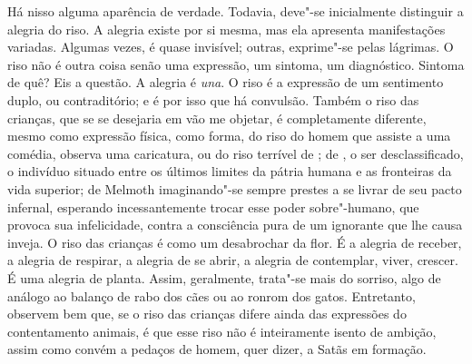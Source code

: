 Há nisso alguma aparência de verdade. Todavia, deve"-se inicialmente
distinguir a alegria do riso. A alegria existe por si mesma, mas ela
apresenta manifestações variadas. Algumas vezes, é quase invisível;
outras, exprime"-se pelas lágrimas. O riso não é outra coisa senão uma
expressão, um sintoma, um diagnóstico. Sintoma de quê? Eis a questão. A
alegria é \textit{una}. O riso é a expressão de um sentimento duplo, ou
contraditório; e é por isso que há convulsão. Também o riso das
crianças, que se se desejaria em vão me objetar, é completamente
diferente, mesmo como expressão física, como forma, do riso do homem
que assiste a uma comédia, observa uma caricatura, ou do riso terrível
de ; de , o ser desclassificado, o indivíduo situado
entre os últimos limites da pátria humana e as fronteiras da vida
superior; de Melmoth imaginando"-se sempre prestes a se livrar de seu
pacto infernal, esperando incessantemente trocar esse poder
sobre"-humano, que provoca sua infelicidade, contra a consciência pura
de um ignorante que lhe causa inveja. O riso das crianças é como um
desabrochar da flor. É a alegria de receber, a alegria de respirar, a
alegria de se abrir, a alegria de contemplar, viver, crescer. É uma
alegria de planta. Assim, geralmente, trata"-se mais do sorriso, algo de
análogo ao balanço de rabo dos cães ou ao ronrom dos gatos. Entretanto,
observem bem que, se o riso das crianças difere ainda das expressões do
contentamento animais, é que esse riso não é inteiramente isento de
ambição, assim como convém a pedaços de homem, quer dizer, a Satãs em
formação.

